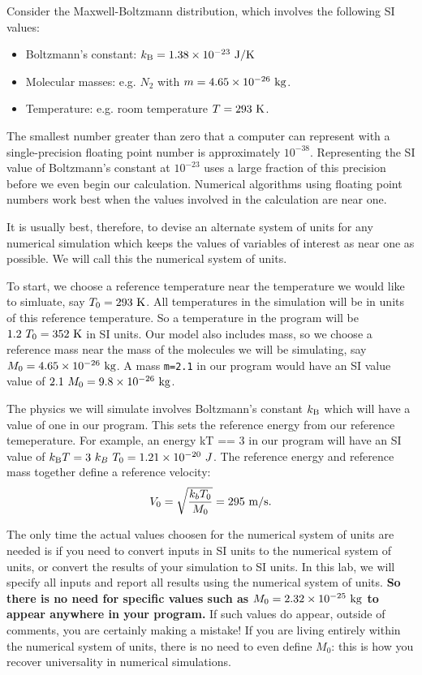 {Consider the Maxwell-Boltzmann distribution, which involves the following SI values:
\begin{itemize}
\item Boltzmann's constant: $k_{\rm B} = 1.38 \times 10^{-23}~\rm J/K$
\item Molecular masses: e.g. $N_2$ with $m =  4.65 \times 10^{-26}~ \rm kg$.
\item Temperature: e.g. room temperature $T = 293~\rm K$.
\end{itemize}
The smallest number greater than zero that a computer can represent
with a single-precision floating point number is approximately
$10^{-38}$. Representing the SI value of Boltzmann's constant at
$10^{-23}$ uses a large fraction of this precision before we even begin
our calculation.  Numerical algorithms using floating point numbers
work best when the values involved in the calculation are near one.

It is usually best, therefore, to devise an alternate system of units
for any numerical simulation which keeps the values of variables of
interest as near one as possible.  We will call this the numerical
system of units.

To start, we choose a reference temperature near the temperature
we would like to simluate, say $T_0 = 293~\rm K$.  All temperatures in
the simulation will be in units of this reference temperature.  So a
temperature  in the program will be $1.2~T_0 = 352~\rm K$
in SI units.  Our model also includes mass, so we choose a reference
mass near the mass of the molecules we will be simulating, say $M_0 =
4.65 \times 10^{-26}~ \rm kg$.  A mass {\tt m=2.1} in our program would have
an SI value value of $2.1~M_0 = 9.8 \times 10^{-26}~ \rm kg$.

The physics we will simulate involves Boltzmann's constant $k_{\rm B}$
which will have a value of one in our program.  This sets the
reference energy from our reference temeperature.  For example, an
energy {kT == 3} in our program will have an SI value of $k_{\rm B}
T = 3~k_B~T_0 = 1.21 \times 10^{-20}~J$.  The reference energy and
reference mass together define a reference velocity:
\begin{displaymath}
V_0 = \sqrt{\frac{k_b T_0}{M_0}} = 295~ \rm m/s.  
\end{displaymath}  

The only time the actual values choosen for the numerical system of
units are needed is if you need to convert inputs in SI units to the
numerical system of units, or convert the results of your simulation
to SI units.  In this lab, we will specify all inputs and report all
results using the numerical system of units.  {\bf So there is no need
  for specific values such as $M_0 = 2.32 \times 10^{-25}~\rm kg$ to
  appear anywhere in your program.}  If such values do appear, outside
of comments, you are certainly making a mistake!  If you are living
entirely within the numerical system of units, there is no need to
even define $M_0$: this is how you recover universality in numerical
simulations.\\

}
